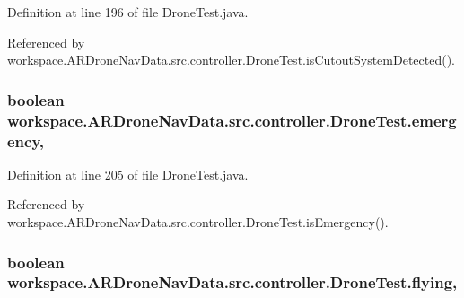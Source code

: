 Definition at line 196 of file Drone\+Test.\+java.



Referenced by workspace.\+A\+R\+Drone\+Nav\+Data.\+src.\+controller.\+Drone\+Test.\+is\+Cutout\+System\+Detected().

\hypertarget{classworkspace_1_1_a_r_drone_nav_data_1_1src_1_1controller_1_1_drone_test_a084d6d4f72d64051b2b5433c17e4fbbb}{}
\subsubsection[{emergency}]{\setlength{\rightskip}{0pt plus 5cm}boolean workspace.\+A\+R\+Drone\+Nav\+Data.\+src.\+controller.\+Drone\+Test.\+emergency\hspace{0.3cm}{\ttfamily [static]}, {\ttfamily [protected]}}\label{classworkspace_1_1_a_r_drone_nav_data_1_1src_1_1controller_1_1_drone_test_a084d6d4f72d64051b2b5433c17e4fbbb}


Definition at line 205 of file Drone\+Test.\+java.



Referenced by workspace.\+A\+R\+Drone\+Nav\+Data.\+src.\+controller.\+Drone\+Test.\+is\+Emergency().

\hypertarget{classworkspace_1_1_a_r_drone_nav_data_1_1src_1_1controller_1_1_drone_test_ac917d3edaa86d8c0b6db911bb3e07551}{}
\subsubsection[{flying}]{\setlength{\rightskip}{0pt plus 5cm}boolean workspace.\+A\+R\+Drone\+Nav\+Data.\+src.\+controller.\+Drone\+Test.\+flying\hspace{0.3cm}{\ttfamily [static]}, {\ttfamily [protected]}}\label{classworkspace_1_1_a_r_drone_nav_data_1_1src_1_1controller_1_1_drone_test_ac917d3edaa86d8c0b6db911bb3e07551}


